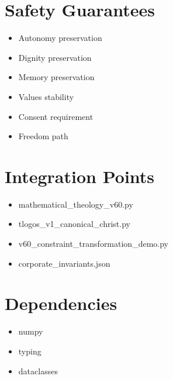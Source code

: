 ﻿\documentclass[12pt]{article}
\begin{document}
\section{Safety Guarantees}

\begin{itemize}    \item Autonomy preservation
    \item Dignity preservation
    \item Memory preservation
    \item Values stability
    \item Consent requirement
    \item Freedom path
\end{itemize}

\section{Integration Points}

\begin{itemize}    \item mathematical_theology_v60.py
    \item tlogos_v1_canonical_christ.py
    \item v60_constraint_transformation_demo.py
    \item corporate_invariants.json
\end{itemize}

\section{Dependencies}

\begin{itemize}    \item numpy
    \item typing
    \item dataclasses
\end{itemize}
\end{document}

